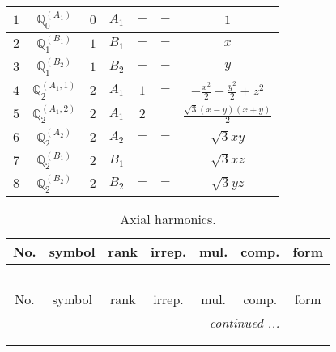 \documentclass[fleqn,10pt,landscape]{article}
\begin{document}
\begin{itemize}
\begin{center}
\begin{longtable}{ccccccc}
$ 1 $ & $ \mathbb{Q}_{0}^{(A_{1})} $ & $ 0 $ & $ A_{1} $ & $ - $ & $ - $ & $ 1 $ \\ \hline
$ 2 $ & $ \mathbb{Q}_{1}^{(B_{1})} $ & $ 1 $ & $ B_{1} $ & $ - $ & $ - $ & $ x $ \\
$ 3 $ & $ \mathbb{Q}_{1}^{(B_{2})} $ & $ 1 $ & $ B_{2} $ & $ - $ & $ - $ & $ y $ \\ \hline
$ 4 $ & $ \mathbb{Q}_{2}^{(A_{1},1)} $ & $ 2 $ & $ A_{1} $ & $ 1 $ & $ - $ & $ - \frac{x^{2}}{2} - \frac{y^{2}}{2} + z^{2} $ \\
$ 5 $ & $ \mathbb{Q}_{2}^{(A_{1},2)} $ & $ 2 $ & $ A_{1} $ & $ 2 $ & $ - $ & $ \frac{\sqrt{3} \left(x - y\right) \left(x + y\right)}{2} $ \\
$ 6 $ & $ \mathbb{Q}_{2}^{(A_{2})} $ & $ 2 $ & $ A_{2} $ & $ - $ & $ - $ & $ \sqrt{3} x y $ \\
$ 7 $ & $ \mathbb{Q}_{2}^{(B_{1})} $ & $ 2 $ & $ B_{1} $ & $ - $ & $ - $ & $ \sqrt{3} x z $ \\
$ 8 $ & $ \mathbb{Q}_{2}^{(B_{2})} $ & $ 2 $ & $ B_{2} $ & $ - $ & $ - $ & $ \sqrt{3} y z $ \\
\end{longtable}
\end{center}
\begin{center}
\renewcommand{\arraystretch}{1.3}
\begin{longtable}{ccccccc}
\caption{Axial harmonics.}
 \\
 \hline \hline
No. & symbol & rank & irrep. & mul. & comp. & form \\ \hline \endfirsthead

\multicolumn{6}{l}{\tablename\ \thetable{}} \\
 \hline \hline
No. & symbol & rank & irrep. & mul. & comp. & form \\ \hline \endhead

 \hline \hline
\multicolumn{6}{r}{\footnotesize\it continued ...} \\ \endfoot

 \hline \hline
\multicolumn{6}{r}{} \\ \endlastfoot


\end{longtable}
\end{center}
\end{itemize}
\end{document}
